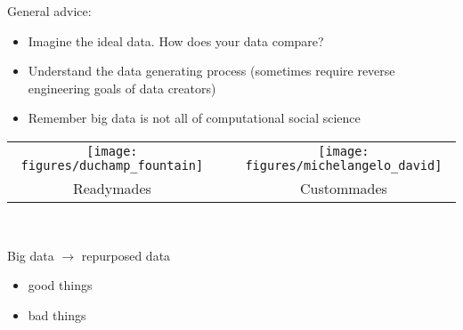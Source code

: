 \documentclass[aspectratio=169]{beamer}
\def\vf{\vfill}
\begin{document}
\begin{frame}

General advice:
\begin{itemize}
\item Imagine the ideal data.  How does your data compare?
\pause
\item Understand the data generating process (sometimes require reverse engineering goals of data creators)
\pause
\item Remember big data is not all of computational social science
\end{itemize}

\end{frame}
\begin{frame}

\begin{center}
\begin{tabular}{ccc}
\texttt{[image: figures/duchamp\_fountain]} & \phantom{12345} & \texttt{[image: figures/michelangelo\_david]} \\
\LARGE{Readymades} &  & \LARGE{Custommades}
\end{tabular}
\end{center}

\vf
\vspace{0.3in}
\\

\end{frame}
\begin{frame}

Big data $\rightarrow$ repurposed data
\pause
\begin{itemize}
\item good things
\item bad things
\end{itemize}

\end{frame}
\end{document}
